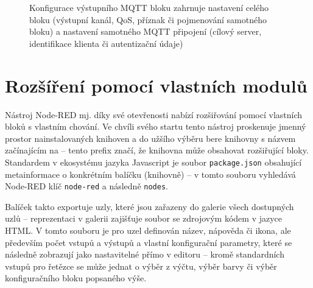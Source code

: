 \begin{figure}%
    \centering
    \qquad
    \caption{%
    Konfigurace výstupního MQTT bloku zahrnuje nastavení celého bloku (výstupní kanál, QoS, příznak 
    či pojmenování samotného bloku) a nastavení samotného MQTT připojení (cílový server, identifikace klienta či
    autentizační údaje)
    }%
    \label{fig:node-red-mqtt-out-conf}
\end{figure}


\section{Rozšíření pomocí vlastních modulů}\label{sec:node-red-rozsireni}

Nástroj Node-RED mj. díky své otevřenosti nabízí rozšiřování pomocí vlastních bloků s vlastním
chování.
Ve chvíli svého startu tento nástroj proskenuje jmenný prostor nainstalovaných knihoven a do užšího výběru bere
knihovny s názvem začínajícím na  -- tento prefix značí, že knihovna může obsahovat rozšiřující
bloky.
Standardem v ekosystému jazyka Javascript je soubor \texttt{package.json} obsahující metainformace o konkrétním
balíčku (knihovně) -- v tomto souboru vyhledává Node-RED klíč \texttt{node-red} a následně \texttt{nodes}.

Balíček takto exportuje uzly, které jsou zařazeny do galerie všech dostupných uzlů -- reprezentaci v galerii zajišťuje
soubor se zdrojovým kódem v jazyce HTML.
V tomto souboru je pro uzel definován název, nápověda či ikona, ale především počet vstupů a výstupů a vlastní
konfigurační parametry, které se následně zobrazují jako nastavitelné přímo v editoru -- kromě standardních vstupů
pro řetězce se může jednat o výběr z výčtu, výběr barvy či výběr konfiguračního bloku popsaného výše.

